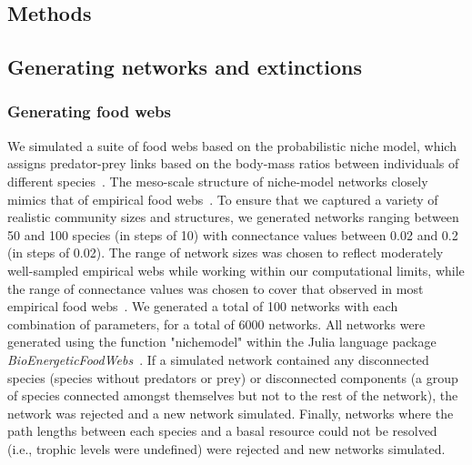 \documentclass[12pt]{article}
\begin{document}
\begin{spacing}{2.0}
\section*{Methods}

    \subsection*{Generating networks and extinctions}

    	\subsubsection*{Generating food webs}
    
    		We simulated a suite of food webs based on the probabilistic niche model, which assigns predator-prey links based on the body-mass ratios between individuals of different species~\citep{Williams2000,Delmas2017}. The meso-scale structure of niche-model networks closely mimics that of empirical food webs~\citep{Stouffer2007}. To ensure that we captured a variety of realistic community sizes and structures, we generated networks ranging between 50 and 100 species (in steps of 10) with connectance values between 0.02 and 0.2 (in steps of 0.02). The range of network sizes was chosen to reflect moderately well-sampled empirical webs while working within our computational limits, while the range of connectance values was chosen to cover that observed in most empirical food webs~\citep{Dunne2002e}. We generated a total of 100 networks with each combination of parameters, for a total of 6000 networks. All networks were generated using the function "nichemodel" within the Julia language package \emph{BioEnergeticFoodWebs}~\citep{bioenergeticfw,Delmas2017}. If a simulated network contained any disconnected species (species without predators or prey) or disconnected components (a group of species connected amongst themselves but not to the rest of the network), the network was rejected and a new network simulated. Finally, networks where the path lengths between each species and a basal resource could not be resolved (i.e., trophic levels were undefined) were rejected and new networks simulated.
    

\end{spacing}
\end{document}
